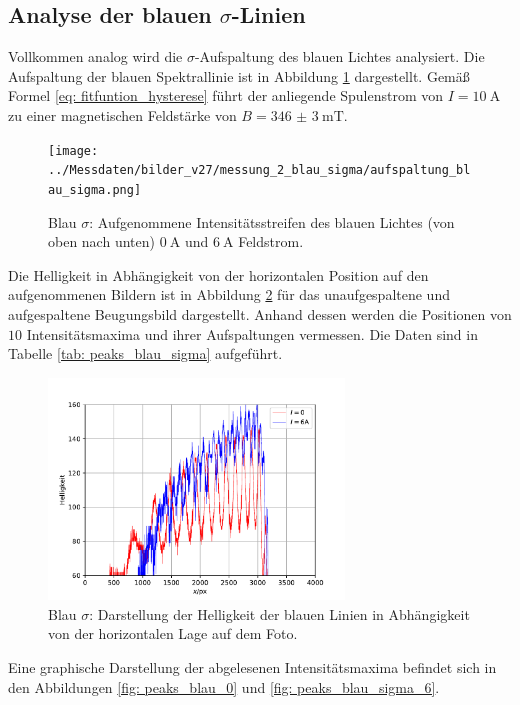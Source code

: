 \subsection{Analyse der blauen $\sigma$-Linien}
Vollkommen analog wird die $\sigma$-Aufspaltung des blauen Lichtes analysiert.
Die Aufspaltung der blauen Spektrallinie ist in Abbildung \ref{fig: aufspaltung_blau_sigma} dargestellt.
Gemäß Formel \eqref{eq: fitfuntion_hysterese}
führt der anliegende Spulenstrom von $I = \SI{10}{\ampere}$ zu einer magnetischen Feldstärke von $B = \SI{346(3)}{\milli\tesla}$.
\begin{figure}
  \centering
  \texttt{[image: ../Messdaten/bilder\_v27/messung\_2\_blau\_sigma/aufspaltung\_blau\_sigma.png]}
  \caption{Blau $\sigma$: Aufgenommene Intensitätsstreifen des blauen Lichtes (von oben nach unten) $\SI{0}{\ampere}$ und $\SI{6}{\ampere}$ Feldstrom.}
  \label{fig: aufspaltung_blau_sigma}
\end{figure}
Die Helligkeit in Abhängigkeit von der horizontalen Position auf den aufgenommenen Bildern ist in Abbildung \ref{fig: blau_intensität_sigma} für das unaufgespaltene
und aufgespaltene Beugungsbild dargestellt. Anhand dessen werden die Positionen von $10$ Intensitätsmaxima und ihrer Aufspaltungen
vermessen. Die Daten sind in Tabelle \ref{tab: peaks_blau_sigma} aufgeführt.
\begin{figure}
  \centering
  \includegraphics[width = 0.7\textwidth]{../Messdaten/plots/blau_sigma_intensitaet.pdf}
  \caption{Blau $\sigma$: Darstellung der Helligkeit der blauen Linien in Abhängigkeit von der horizontalen Lage auf dem Foto.}
  \label{fig: blau_intensität_sigma}
\end{figure}

Eine graphische Darstellung der abgelesenen Intensitätsmaxima befindet sich in den Abbildungen \ref{fig: peaks_blau_0} und \ref{fig: peaks_blau_sigma_6}.
